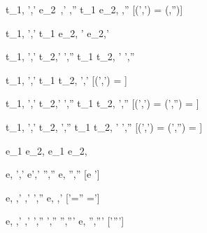   {t_1,\hat{\sigma} \hat{\stride} ',\hat{\sigma}'  \Quad
   e_2\ ,\hat{\sigma}' \hat{\eval} ,\hat{\sigma}''}
  {t_1 \Then e_2,\hat{\sigma} \hat{\stride} ,\hat{\sigma}''}
  [\Value(',\hat{\sigma}') =  \land \lnot\Failing(,\hat{\sigma}'')]

  {t_1,\hat{\sigma} \hat{\stride} ',\hat{\sigma}'}
  {t_1 \Next e_2,\hat{\sigma} \hat{\stride} ' \Next e_2,\hat{\sigma}'}


  {t_1,\hat{\sigma}  \hat{\stride} ',\hat{\sigma}'  \Quad
   t_2,\hat{\sigma}' \hat{\stride} ',\hat{\sigma}''}
  {t_1 \And t_2,\hat{\sigma} \hat{\stride} ' \And {}',\hat{\sigma}''}


  {t_1,\hat{\sigma}  \hat{\stride} ',\hat{\sigma}'}
  {t_1 \Or t_2,\hat{\sigma} \hat{\stride} ',\hat{\sigma}'}
  [\Value(',\hat{\sigma}') = ]

  {t_1,\hat{\sigma}  \hat{\stride} ',\hat{\sigma}'  \Quad
   t_2,\hat{\sigma}' \hat{\stride} ',\hat{\sigma}''}
  {t_1 \Or t_2,\hat{\sigma} \hat{\stride} ',\hat{\sigma}''}
  [\Value(',\hat{\sigma}') = \bot \land \Value(',\hat{\sigma}'') = ]

  {t_1,\hat{\sigma}  \hat{\stride }',\hat{\sigma}'  \Quad
   t_2,\hat{\stride} ',\hat{\sigma}''}
  {t_1 \Or t_2,\hat{\sigma} \hat{\stride} ' \Or {}',\hat{\sigma}''}
  [\Value(',\hat{\sigma}') = \bot \land \Value(',\hat{\sigma}'') = \bot]


  { }
  {e_1 \Xor e_2,\hat{\sigma} \hat{\stride} e_1 \Xor e_2,\hat{\sigma}}

    {e,\hat{\sigma} \hat{\eval} ',\hat{\sigma}'  \Quad
     e',\hat{\sigma}' \hat{\stride} '',\hat{\sigma}''}
    {e,\hat{\sigma} \hat{\stride} '',\hat{\sigma}''}
    [e \neq {}']


    {e,\hat{\sigma} \hat{\eval} ,\hat{\sigma}' \Quad
     ,\hat{\sigma}' \hat{\stride} ',\hat{\sigma}''}
    {e,\hat{\sigma} \hat{\normalise} ,\hat{\sigma}'}
    [\hat{\sigma}'=\hat{\sigma}'' \land {}=']

    {e,\hat{\sigma} \hat{\eval} ,\hat{\sigma}'  \Quad
     ,\hat{\sigma}' \hat{\stride} ',\hat{\sigma}''  \Quad
     ',\hat{\sigma}'' \hat{\normalise} '',\hat{\sigma}'''}
    {e,\hat{\sigma} \hat{\normalise} '',\hat{\sigma}'''}
    [\hat{\sigma}'\neq \hat{\sigma}''\vee {}\neq {}']



